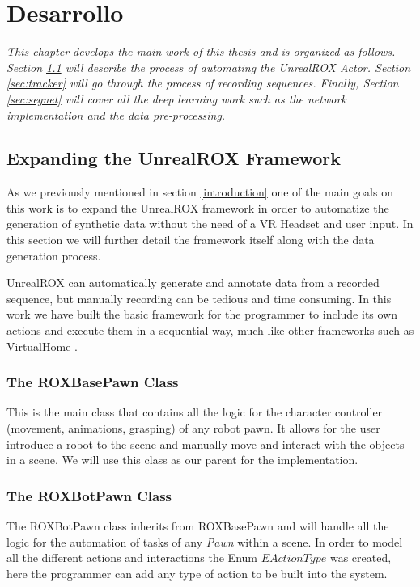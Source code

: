 
\chapter{Desarrollo}
\label{desarrollo}
\textit{This chapter develops the main work of this thesis and is organized as follows. Section \ref{sec:expanding} will describe the process of automating the UnrealROX Actor. Section \ref{sec:tracker} will go through the process of recording sequences. Finally, Section \ref{sec:segnet} will cover all the deep learning work such as the network implementation and the data pre-processing.  }

\section{Expanding the UnrealROX Framework}
\label{sec:expanding}
As we previously mentioned in section \ref{introduction} one of the main goals on this work is to expand the UnrealROX framework in order to automatize the generation of synthetic data without the need of a VR Headset and user input. In this section we will further detail the framework itself along with the data generation process.

UnrealROX can automatically generate and annotate data from a recorded sequence, but manually recording can be tedious and time consuming. In this work we have built the basic framework for the programmer to include its own actions and execute them in a sequential way, much like other frameworks such as VirtualHome \cite{virtualhome2018}. 

\subsection{The ROXBasePawn Class}
This is the main class that contains all the logic for the character controller (movement, animations, grasping) of any robot pawn. It allows for the user introduce a robot to the scene and manually move and interact with the objects in a scene. We will use this class as our parent for the implementation.

\subsection{The ROXBotPawn Class}
The ROXBotPawn class inherits from ROXBasePawn and will handle all the logic for the automation of tasks of any \textit{Pawn} within a scene. In order to model all the different actions and interactions the Enum $EActionType$ was created, here the programmer can add any type of action to be built into the system.

